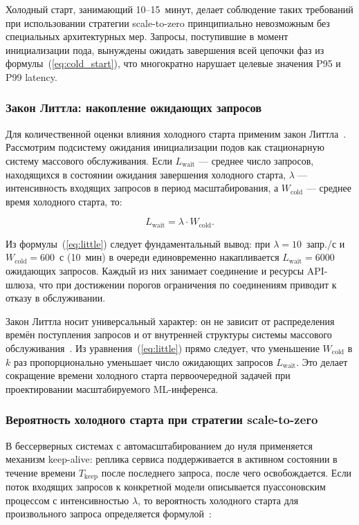 Холодный старт, занимающий 10--15~минут, делает соблюдение таких требований при использовании стратегии scale-to-zero принципиально невозможным без специальных архитектурных мер. Запросы, поступившие в момент инициализации пода, вынуждены ожидать завершения всей цепочки фаз из формулы~(\ref{eq:cold_start}), что многократно нарушает целевые значения P95 и P99 latency.

\subsubsection{Закон Литтла: накопление ожидающих запросов}

Для количественной оценки влияния холодного старта применим закон Литтла~\cite{little1961}. Рассмотрим подсистему ожидания инициализации подов как стационарную систему массового обслуживания. Если $L_{\mathrm{wait}}$ --- среднее число запросов, находящихся в состоянии ожидания завершения холодного старта, $\lambda$ --- интенсивность входящих запросов в период масштабирования, а $W_{\mathrm{cold}}$ --- среднее время холодного старта, то:

\begin{equation}
L_{\mathrm{wait}} = \lambda \cdot W_{\mathrm{cold}}.
\label{eq:little}
\end{equation}

Из формулы~(\ref{eq:little}) следует фундаментальный вывод: при $\lambda = 10$~запр./с и $W_{\mathrm{cold}} = 600$~с (10~мин) в очереди единовременно накапливается $L_{\mathrm{wait}} = 6000$ ожидающих запросов. Каждый из них занимает соединение и ресурсы API-шлюза, что при достижении порогов ограничения по соединениям приводит к отказу в обслуживании.

Закон Литтла носит универсальный характер: он не зависит от распределения времён поступления запросов и от внутренней структуры системы массового обслуживания~\cite{little1961}. Из уравнения~(\ref{eq:little}) прямо следует, что уменьшение $W_{\mathrm{cold}}$ в $k$ раз пропорционально уменьшает число ожидающих запросов $L_{\mathrm{wait}}$. Это делает сокращение времени холодного старта первоочередной задачей при проектировании масштабируемого ML-инференса.

\subsubsection{Вероятность холодного старта при стратегии scale-to-zero}

В бессерверных системах с автомасштабированием до нуля применяется механизм keep-alive: реплика сервиса поддерживается в активном состоянии в течение времени $T_{\mathrm{keep}}$ после последнего запроса, после чего освобождается. Если поток входящих запросов к конкретной модели описывается пуассоновским процессом с интенсивностью $\lambda$, то вероятность холодного старта для произвольного запроса определяется формулой~\cite{little1961}:

